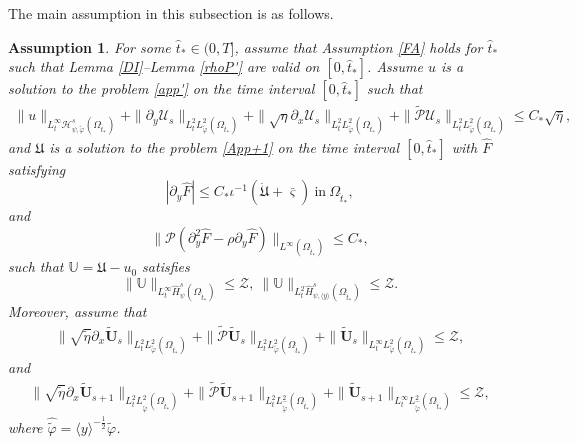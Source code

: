 \documentclass{amsart}
\numberwithin{equation}{section}
\newtheorem{assumption}{Assumption}[section]
\newcommand\y{{{\langle y \rangle}}}
\begin{document}
The main assumption in this subsection is as follows.
\begin{assumption}\label{peA}
For some $\hat{t}_{*}\in(0,T]$, assume that
Assumption \ref{FA} holds for $\hat{t}_{*}$ such that  Lemma \ref{DI}--Lemma \ref{rhoP'} are valid on $[0,\hat{t}_{*}]$. Assume $u$ is a solution to the problem \eqref{app'} on the time interval $[0,\hat{t}_{*}]$ such that
\begin{align*}
 \|u\|_{L_{t}^{\infty}\mathcal{H}_{\psi,\tilde{\varphi}}^{s}(\Omega_{\hat{t}_{*}})}
+\|\partial_{y}\mathcal{U}_{s}\|_{L_{t}^{2}L_{\tilde{\varphi}}^{2}(\Omega_{\hat{t}_{*}})}
+\|\sqrt{\eta}\partial_{x}\mathcal{U}_{s}\|_{L_{t}^{2}L_{\tilde{\varphi}}^{2}(\Omega_{\hat{t}_{*}})}
+\|\tilde{\mathcal{P}}\mathcal{U}_{s}\|_{L_{t}^{2}L_{\tilde{\varphi}}^{2}(\Omega_{\hat{t}_{*}})}
\leq C_{*}\sqrt{\bar{\eta}},
\end{align*}
and $\mathfrak{U}$ is a solution to the problem \eqref{App+1} on the time interval $[0,\hat{t}_{*}]$ with $\hat{F}$ satisfying
$$|\partial_{y}\hat{F}|\leq C_{*}\iota^{-1}(\dot{\mathfrak{U}}+\bar{\varsigma})~\text{in}~\Omega_{\hat{t}_{*}},$$
and
$$\|\mathcal{P}(\partial_{y}^{2}\hat{F}-\rho\partial_{y}\hat{F})\|_{L^{\infty}(\Omega_{\hat{t}_{*}})}\leq C_{*},$$
such that $\mathbb{U}=\mathfrak{U}-u_{0}$ satisfies
$$\|\mathbb{U}\|_{L_{t}^{\infty}\hat{H}_{\psi}^{s}(\Omega_{\hat{t}_{*}})}\leq \mathcal{Z},
~\|\mathbb{U}\|_{L_{t}^{2}\hat{H}_{\psi,\y}^{s}(\Omega_{\hat{t}_{*}})}\leq \mathcal{Z}.$$
Moreover, assume that
\begin{align*}
 \|\sqrt{\tilde{\eta}}\partial_{x}\tilde{\mathbf{U}}_{s}\|_{L_{t}^{2}L_{\tilde{\varphi}}^{2}(\Omega_{\hat{t}_{*}})}
+\|\tilde{\mathcal{P}}\tilde{\mathbf{U}}_{s}\|_{L_{t}^{2}L_{\tilde{\varphi}}^{2}(\Omega_{\hat{t}_{*}})}
+\|\tilde{\mathbf{U}}_{s}\|_{L_{t}^{\infty}L_{\tilde{\varphi}}^{2}(\Omega_{\hat{t}_{*}})}
\leq \mathcal{Z},
\end{align*}
and
\begin{align*}
 \|\sqrt{\tilde{\eta}}\partial_{x}\tilde{\mathbf{U}}_{s+1}\|_{L_{t}^{2}L_{\hat{\tilde{\varphi}}}^{2}(\Omega_{\hat{t}_{*}})}
+\|\tilde{\mathcal{P}}\tilde{\mathbf{U}}_{s+1}\|_{L_{t}^{2}L_{\hat{\tilde{\varphi}}}^{2}(\Omega_{\hat{t}_{*}})}
+\|\tilde{\mathbf{U}}_{s+1}\|_{L_{t}^{\infty}L_{\hat{\tilde{\varphi}}}^{2}(\Omega_{\hat{t}_{*}})}
\leq \mathcal{Z},
\end{align*}
where $\hat{\tilde{\varphi}}=\y^{-\frac{1}{2}}\tilde{\varphi}$.
\end{assumption}
\end{document}
